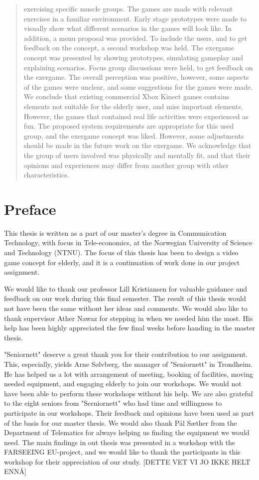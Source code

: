 \documentclass[b5paper,twoside,openright,11pt]{report}
\begin{document}
\begin{abstract}
exercising specific muscle groups. The games are made with relevant exercises in a familiar environment. Early stage prototypes were made to visually show what different scenarios in the games will look like. In addition, a menu proposal was provided. To include the users, and to get feedback on the concept, a second workshop was held.  The exergame concept was presented by showing prototypes, simulating gameplay and explaining scenarios. Focus group discussions were held, to get feedback on the exergame. The overall perception was positive, however, some aspects of the games were unclear, and some suggestions for the games were made. We conclude that existing commercial Xbox Kinect games contains elements not suitable for the elderly user, and miss important elements. However, the games that contained real life activities were experienced as fun. The proposed system requirements are appropriate for this used group, and the exergame concept was liked. However, some adjustments should be made in the future work on the exergame. We acknowledge that the group of users involved was physically and mentally fit, and that their opinions and experiences may differ from another group with other characteristics.




\end{abstract}
\cleardoublepage
\chapter*{Preface}
This thesis is written as a part of our master's degree in Communication Technology, with focus in Tele-economics, at the Norwegian University of Science and Technology (NTNU). The focus of this thesis has been to design a video game concept for elderly, and it is a continuation of work done in our project assignment. 

We would like to thank our professor Lill Kristiansen for valuable guidance and feedback on our work during this final semester. The result of this thesis would not have been the same without her ideas and comments. We would also like to thank supervisor Ather Nawaz for stepping in when we needed him the most. His help has been highly appreciated the few final weeks before handing in the master thesis.  

"Seniornett" deserve a great thank you for their contribution to our assignment. This, especially, yields Arne Sølvberg, the manager of "Seniornett" in Trondheim. He has helped us a lot with arrangement of meeting, booking of facilities, moving needed equipment, and engaging elderly to join our workshops. We would not have been able to perform these workshops without his help. We are also grateful to the eight seniors from "Serniornett" who had time and willingness to participate in our workshops. Their feedback and opinions have been used as part of the basis for our master thesis. We would also thank Pål Sæther from the Department of Telematics for always helping us finding the equipment we would need. The main findings in out thesis was presented in a workshop with the FARSEEING EU-project, and we would like to thank the participants in this workshop for their appreciation of our study. [DETTE VET VI JO IKKE HELT ENNÅ]       
\end{document}
